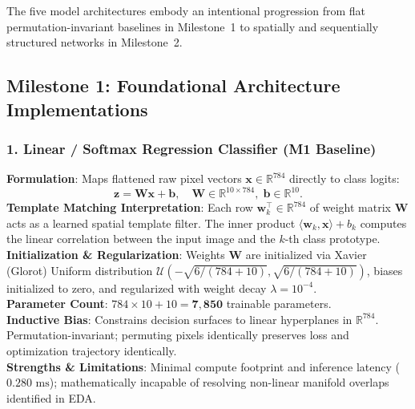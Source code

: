 \documentclass[11pt, a4paper]{article}
\begin{document}
The five model architectures embody an intentional progression from flat permutation-invariant baselines in Milestone~1 to spatially and sequentially structured networks in Milestone~2.

\subsection{Milestone 1: Foundational Architecture Implementations}

\subsubsection{1. Linear / Softmax Regression Classifier (M1 Baseline)}
\textbf{Formulation}: Maps flattened raw pixel vectors $\mathbf{x} \in \mathbb{R}^{784}$ directly to class logits:
\begin{equation}
  \mathbf{z} = \mathbf{W}\mathbf{x} + \mathbf{b}, \quad \mathbf{W} \in \mathbb{R}^{10 \times 784}, \; \mathbf{b} \in \mathbb{R}^{10}.
\end{equation}
\textbf{Template Matching Interpretation}: Each row $\mathbf{w}_k^\top \in \mathbb{R}^{784}$ of weight matrix $\mathbf{W}$ acts as a learned spatial template filter. The inner product $\langle \mathbf{w}_k, \mathbf{x} \rangle + b_k$ computes the linear correlation between the input image and the $k$-th class prototype.\\
\textbf{Initialization \& Regularization}: Weights $\mathbf{W}$ are initialized via Xavier (Glorot) Uniform distribution $\mathcal{U}(-\sqrt{6/(784+10)}, \sqrt{6/(784+10)})$, biases initialized to zero, and regularized with weight decay $\lambda = 10^{-4}$.\\
\textbf{Parameter Count}: $784 \times 10 + 10 = \mathbf{7{,}850}$ trainable parameters.\\
\textbf{Inductive Bias}: Constrains decision surfaces to linear hyperplanes in $\mathbb{R}^{784}$. Permutation-invariant; permuting pixels identically preserves loss and optimization trajectory identically.\\
\textbf{Strengths \& Limitations}: Minimal compute footprint and inference latency ($0.280\text{ ms}$); mathematically incapable of resolving non-linear manifold overlaps identified in EDA.
\end{document}
